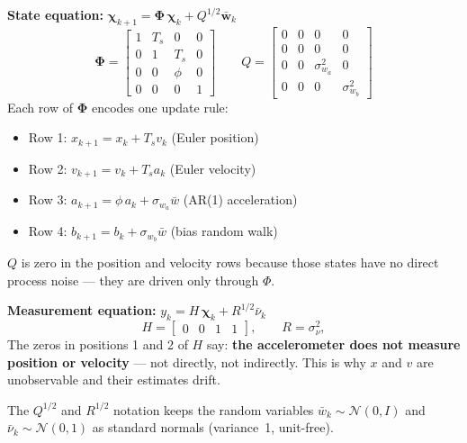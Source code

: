 \documentclass[12pt, a4paper]{article}
\begin{document}
\textbf{State equation:}
$\boldsymbol{\chi}_{k+1} = \boldsymbol{\Phi}\,\boldsymbol{\chi}_k + Q^{1/2}\bar{\mathbf{w}}_k$
\vspace{-0.3cm}
\[
\boldsymbol{\Phi} =
\begin{bmatrix}
  1 & T_s & 0    & 0 \\
  0 & 1   & T_s  & 0 \\
  0 & 0   & \phi & 0 \\
  0 & 0   & 0    & 1
\end{bmatrix}
\qquad
Q =
\begin{bmatrix}
  0 & 0 & 0              & 0              \\
  0 & 0 & 0              & 0              \\
  0 & 0 & \sigma_{w_a}^2 & 0              \\
  0 & 0 & 0              & \sigma_{w_b}^2
\end{bmatrix}
\]
\vspace{-0.2cm}
Each row of $\boldsymbol{\Phi}$ encodes one update rule:
\begin{itemize}[leftmargin=1.4em]
  \item Row 1: $x_{k+1} = x_k + T_s v_k$ \quad (Euler position)
  \item Row 2: $v_{k+1} = v_k + T_s a_k$ \quad (Euler velocity)
  \item Row 3: $a_{k+1} = \phi\,a_k + \sigma_{w_a}\bar{w}$ \quad (AR(1) acceleration)
  \item Row 4: $b_{k+1} = b_k + \sigma_{w_b}\bar{w}$ \quad (bias random walk)
\end{itemize}

$Q$ is zero in the position and velocity rows because those states
have no direct process noise --- they are driven only through $\Phi$.

\textbf{Measurement equation:}
$y_k = H\,\boldsymbol{\chi}_k + R^{1/2}\bar{\nu}_k$
\vspace{-0.3cm}
\[
H = \begin{bmatrix} 0 & 0 & 1 & 1 \end{bmatrix}, \qquad R = \sigma_\nu^2,
\]
The zeros in positions 1 and 2 of $H$ say: \textbf{the accelerometer does not
measure position or velocity} --- not directly, not indirectly.
This is why $x$ and $v$ are unobservable and their estimates drift.

The $Q^{1/2}$ and $R^{1/2}$ notation keeps the random variables
$\bar{w}_k \sim \mathcal{N}(0,I)$ and $\bar{\nu}_k \sim \mathcal{N}(0,1)$
as standard normals (variance~1, unit-free).
\end{document}
